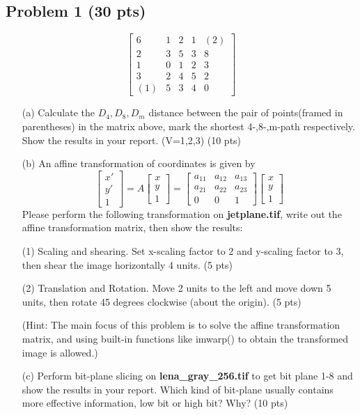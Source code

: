 \documentclass[11pt,letterpaper]{article}
\begin{document}
\subsection*{Problem 1 (30 pts)}
$$
\begin{bmatrix}
6 & 1 & 2 & 1 & (2)\\ 
2 & 3 & 5 & 3 & 8\\ 
1 & 0 & 1 & 2 & 3\\ 
3 & 2 & 4 & 5 & 2\\ 
(1) & 5 & 3 & 4 & 0
\end{bmatrix}
$$
\begin{itemize}
\item[(a)] Calculate the $D_4,D_8,D_m$ distance between the pair of points(framed in parentheses) in the matrix above, mark the shortest 4-,8-,m-path respectively. Show the results in your report. (V=1,2,3) (10 pts)
\item[(b)] An affine transformation of coordinates is given by
$$
\begin{bmatrix}
x'
\\ 
y'
\\ 
1
\end{bmatrix}
=A\begin{bmatrix}
x\\ y\\ 1
\end{bmatrix}
=\begin{bmatrix}
a_{11} & a_{12} & a_{13}\\ 
a_{21} & a_{22} & a_{23}\\ 
0 & 0 & 1
\end{bmatrix}\begin{bmatrix}
x\\y 
\\ 1
\end{bmatrix}
$$
Please perform the following transformation on \textbf{jetplane.tif}, write out the affine transformation matrix, then show the results:

(1) Scaling and shearing. Set x-scaling factor to 2 and y-scaling factor to 3, then shear the image horizontally 4
units. (5 pts)

(2) Translation and Rotation. Move 2 units to the left and move down 5 units, then rotate 45 degrees clockwise
(about the origin). (5 pts)

(\textcolor[rgb]{1,0,0}{Hint:} The main focus of this problem is to solve the affine transformation matrix, and using built-in functions like imwarp() to obtain the transformed image is allowed.)
\item[(c)] Perform bit-plane slicing on \textbf{lena\_gray\_256.tif} to get bit plane 1-8 and show the results in your report. Which kind of bit-plane usually contains more effective information, low bit or high bit? Why? (10 pts)
\end{itemize}
\end{document}
